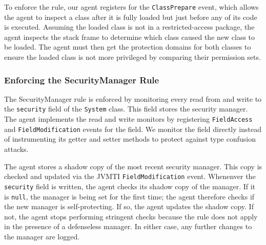 \documentclass{sig-alternate}
\begin{document}
To enforce the rule, our agent registers for
the \texttt{ClassPrepare} event, which allows the agent to inspect
a class after it is fully loaded but just before any of its code is
executed. Assuming the loaded class is not in a restricted-access
package, the agent inspects the stack frame to determine which class
caused the new class to be loaded. The agent must then get the protection
domains for both classes to ensure the loaded class is not more privileged by comparing their permission sets.

\subsubsection{Enforcing the SecurityManager Rule}\label{sub:Enforcing-the-SecurityManager}

The SecurityManager rule is enforced by monitoring every read from
and write to the \texttt{security} field of the \texttt{System} class.
This field stores the security manager.
The agent implements the read and write monitors by registering
\texttt{FieldAccess} and \texttt{FieldModification} events for the field. We 
monitor the field directly instead of instrumenting its getter and setter
methods to protect against type confusion attacks. 

The agent stores a shadow copy of the most recent security
manager. This copy is checked and updated via the JVMTI \texttt{FieldModification} event.
Whenenver the \texttt{security} field is written, the agent checks its
shadow copy of the manager.  If it is \texttt{null},
the manager is being set for the first time; the agent therefore checks
if the new manager is self-protecting. If so, 
the agent updates the shadow copy. If not, the agent stops performing stringent checks because the rule does not apply in the presence of a defenseless
manager. In either case, any further changes to the manager are logged.
\end{document}
